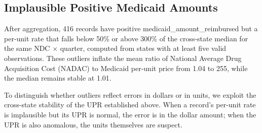 \subsection{Implausible Positive Medicaid Amounts}

After aggregation, 416 records have positive medicaid\_amount\_reimbursed but a per-unit rate that falls below 50\% or above 300\% of the cross-state median for the same NDC $\times$ quarter, computed from states with at least five valid observations. These outliers inflate the mean ratio of National Average Drug Acquisition Cost (NADAC) to Medicaid per-unit price from 1.04 to 255, while the median remains stable at 1.01.

To distinguish whether outliers reflect errors in dollars or in units, we exploit the cross-state stability of the UPR established above. When a record's per-unit rate is implausible but its UPR is normal, the error is in the dollar amount; when the UPR is also anomalous, the units themselves are suspect. 

